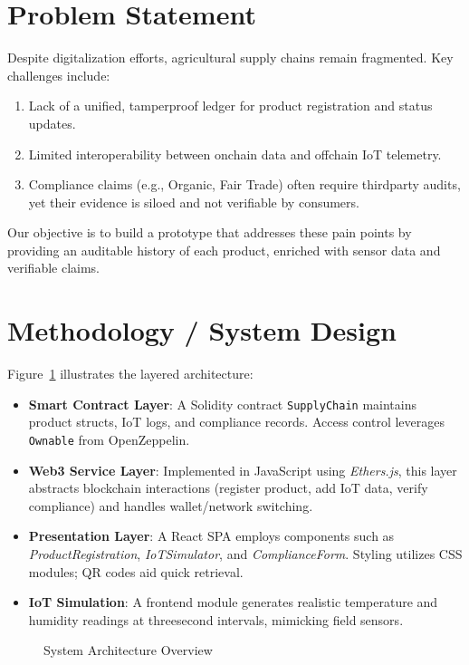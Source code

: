 \documentclass[conference]{IEEEtran}
\begin{document}
\section{Problem Statement}
Despite digitalization efforts, agricultural supply chains remain fragmented. Key challenges include:
\begin{enumerate}
    \item Lack of a unified, tamper\textendash proof ledger for product registration and status updates.
    \item Limited interoperability between on\textendash chain data and off\textendash chain IoT telemetry.
    \item Compliance claims (e.g., Organic, Fair Trade) often require third\textendash party audits, yet their evidence is siloed and not verifiable by consumers.
\end{enumerate}
Our objective is to build a prototype that addresses these pain points by providing an auditable history of each product, enriched with sensor data and verifiable claims.

\section{Methodology / System Design}
Figure~\ref{fig:architecture} illustrates the layered architecture:
\begin{itemize}
    \item \textbf{Smart Contract Layer}: A Solidity contract \texttt{SupplyChain} maintains product structs, IoT logs, and compliance records. Access control leverages \texttt{Ownable} from OpenZeppelin.
    \item \textbf{Web3 Service Layer}: Implemented in JavaScript using \textit{Ethers.js}, this layer abstracts blockchain interactions (register product, add IoT data, verify compliance) and handles wallet/network switching.
    \item \textbf{Presentation Layer}: A React SPA employs components such as \textit{ProductRegistration}, \textit{IoTSimulator}, and \textit{ComplianceForm}. Styling utilizes CSS modules; QR codes aid quick retrieval.
    \item \textbf{IoT Simulation}: A front\textendash end module generates realistic temperature and humidity readings at three\textendash second intervals, mimicking field sensors.
\end{itemize}
\begin{figure}[t]
    \centering
    \fbox{\rule{0pt}{2in} \rule{0.9\linewidth}{0pt}}
    \caption{System Architecture Overview}
    \label{fig:architecture}
\end{figure}
\end{document}
